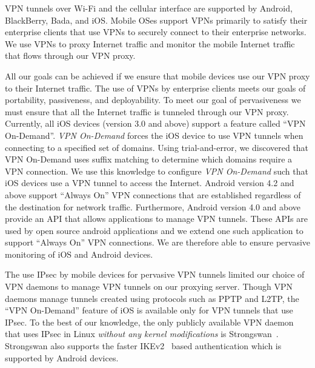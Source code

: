 VPN tunnels over Wi-Fi and the cellular interface are supported by Android, BlackBerry, Bada, and iOS. 
Mobile OSes support VPNs primarily to satisfy their enterprise clients that use VPNs to securely connect to their enterprise networks. 
We use VPNs to proxy Internet traffic and monitor the mobile Internet traffic that flows through our VPN proxy.  

All our goals can be achieved if we ensure that mobile devices use our VPN proxy to their Internet traffic.
The use of VPNs by enterprise clients meets our goals of portability, passiveness, and deployability.
To meet our goal of pervasiveness we must ensure that all the Internet traffic is tunneled through our VPN proxy. 
Currently, all iOS devices (version 3.0 and above) support a feature called ``VPN On-Demand''. 
\emph{VPN On-Demand} forces the iOS device to use VPN tunnels when connecting to a specified set of domains.
Using trial-and-error, we discovered that VPN On-Demand uses suffix matching to determine which domains require a VPN connection.
We use this knowledge to configure \emph{VPN On-Demand} such that iOS devices use a VPN tunnel to access the Internet.
Android version 4.2 and above support ``Always On'' VPN connections that are established regardless of the destination for network traffic. 
Furthermore, Android version 4.0 and above provide an API that allows applications to manage VPN tunnels. 
These APIs are used by open source android applications and we extend one such application to support ``Always On'' VPN connections. We are therefore able to ensure pervasive monitoring of iOS and Android devices. 

The use IPsec by mobile devices for pervasive VPN tunnels limited our choice of VPN daemons to manage VPN tunnels on our proxying server.
Though VPN daemons manage tunnels created using protocols such as PPTP and L2TP, the ``VPN On-Demand'' feature of iOS is available only for VPN tunnels that use IPsec.  
To the best of our knowledge, the only publicly available VPN daemon that uses IPsec in Linux \emph{without any kernel modifications} is Strongswan~\cite{strongswan}.
Strongswan also supports the faster IKEv2~\cite{rfc5996} based authentication which is supported by Android devices. 

